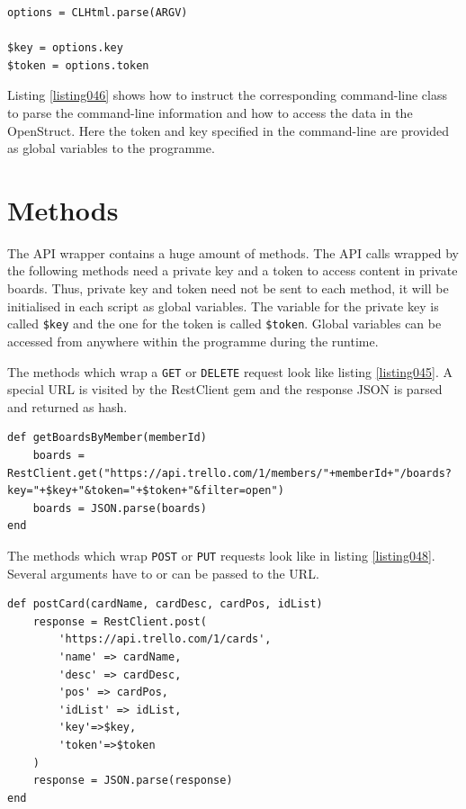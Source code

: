 \begin{lstlisting}[aboveskip=1\baselineskip, caption=Reading the OpenStruct\index{OpenStruct} containing the command-line information., label=listing046]
options = CLHtml.parse(ARGV)

$key = options.key
$token = options.token
\end{lstlisting}

Listing \ref{listing046} shows how to instruct the corresponding command-line class to parse the command-line information and how to access the data in the OpenStruct. Here the token and key specified in the command-line are provided as global variables to the programme.

\section{Methods}
The API wrapper contains a huge amount of methods. The API calls wrapped by the following methods need a private key and a token to access content in private boards. Thus, private key and token need not be sent to each method, it will be initialised in each script as global variables. The variable for the private key is called \lstinline{$key} and the one for the token is called \lstinline{$token}. Global variables can be accessed from anywhere within the programme during the runtime.

The methods which wrap a \texttt{GET} or \texttt{DELETE} request look like listing \ref{listing045}. A special URL is visited by the RestClient gem and the response JSON is parsed and returned as hash. 

\begin{lstlisting}[aboveskip=1\baselineskip, caption=\lstinline{getBoardsByMember()}, label=listing045]
def getBoardsByMember(memberId)
	boards = RestClient.get("https://api.trello.com/1/members/"+memberId+"/boards?key="+$key+"&token="+$token+"&filter=open")
	boards = JSON.parse(boards)
end
\end{lstlisting}

The methods which wrap \texttt{POST} or \texttt{PUT} requests look like in listing \ref{listing048}. Several arguments have to or can be passed to the URL. 

\begin{lstlisting}[aboveskip=1\baselineskip, caption=\lstinline{postCard()}, label=listing048]
def postCard(cardName, cardDesc, cardPos, idList)
	response = RestClient.post(
		'https://api.trello.com/1/cards',
		'name' => cardName,
		'desc' => cardDesc,
		'pos' => cardPos,
		'idList' => idList,
		'key'=>$key,
		'token'=>$token
	)
	response = JSON.parse(response)
end
\end{lstlisting}

